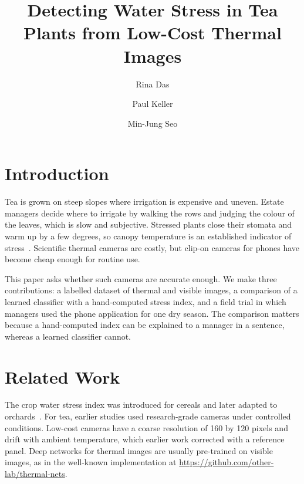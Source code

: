 \documentclass[10pt,twocolumn]{article}
\title{Detecting Water Stress in Tea Plants from Low-Cost Thermal Images}
\author{Rina Das \and Paul Keller \and Min-Jung Seo}
\date{}
\begin{document}
\section{Introduction}
Tea is grown on steep slopes where irrigation is expensive and uneven. Estate managers decide where to irrigate by walking the rows and judging the colour of the leaves, which is slow and subjective. Stressed plants close their stomata and warm up by a few degrees, so canopy temperature is an established indicator of stress~\cite{jones2004}. Scientific thermal cameras are costly, but clip-on cameras for phones have become cheap enough for routine use.

This paper asks whether such cameras are accurate enough. We make three contributions: a labelled dataset of thermal and visible images, a comparison of a learned classifier with a hand-computed stress index, and a field trial in which managers used the phone application for one dry season. The comparison matters because a hand-computed index can be explained to a manager in a sentence, whereas a learned classifier cannot.

\section{Related Work}
The crop water stress index was introduced for cereals and later adapted to orchards~\cite{idso1981}. For tea, earlier studies used research-grade cameras under controlled conditions. Low-cost cameras have a coarse resolution of 160 by 120 pixels and drift with ambient temperature, which earlier work corrected with a reference panel. Deep networks for thermal images are usually pre-trained on visible images, as in the well-known implementation at \url{https://github.com/other-lab/thermal-nets}.
\end{document}
